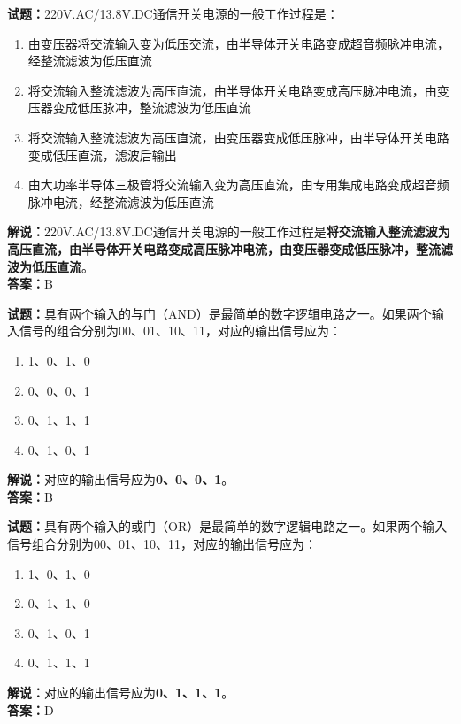 \documentclass{ctexbook}
\begin{document}
\bigskip


\noindent\textbf{试题：}220V.AC/13.8V.DC通信开关电源的一般工作过程是：
\begin{enumerate}[leftmargin=3em]
\item 由变压器将交流输入变为低压交流，由半导体开关电路变成超音频脉冲电流，经整流滤波为低压直流
\item 将交流输入整流滤波为高压直流，由半导体开关电路变成高压脉冲电流，由变压器变成低压脉冲，整流滤波为低压直流
\item 将交流输入整流滤波为高压直流，由变压器变成低压脉冲，由半导体开关电路变成低压直流，滤波后输出
\item 由大功率半导体三极管将交流输入变为高压直流，由专用集成电路变成超音频脉冲电流，经整流滤波为低压直流
\end{enumerate}
\noindent\textbf{解说：}220V.AC/13.8V.DC通信开关电源的一般工作过程是\textbf{将交流输入整流滤波为高压直流，由半导体开关电路变成高压脉冲电流，由变压器变成低压脉冲，整流滤波为低压直流}。\\\noindent\textbf{答案：}B





\bigskip


\noindent\textbf{试题：}具有两个输入的与门（AND）是最简单的数字逻辑电路之一。如果两个输入信号的组合分别为00、01、10、11，对应的输出信号应为：
\begin{enumerate}[leftmargin=3em]
\item 1、0、1、0
\item 0、0、0、1
\item 0、1、1、1
\item 0、1、0、1
\end{enumerate}
\noindent\textbf{解说：}对应的输出信号应为\textbf{0、0、0、1}。\\\noindent\textbf{答案：}B





\bigskip


\noindent\textbf{试题：}具有两个输入的或门（OR）是最简单的数字逻辑电路之一。如果两个输入信号组合分别为00、01、10、11，对应的输出信号应为：
\begin{enumerate}[leftmargin=3em]
\item 1、0、1、0
\item 0、1、1、0
\item 0、1、0、1
\item 0、1、1、1
\end{enumerate}
\noindent\textbf{解说：}对应的输出信号应为\textbf{0、1、1、1}。\\\noindent\textbf{答案：}D
\end{document}
